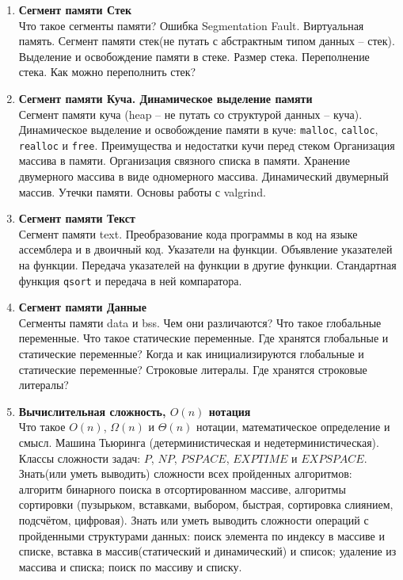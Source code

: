 \documentclass{article}
\begin{document}
\begin{enumerate}
\item \textbf{Сегмент памяти Стек}\\
Что такое сегменты памяти? Ошибка Segmentation Fault. Виртуальная память. Сегмент памяти стек(не путать с абстрактным типом данных -- стек). Выделение и освобождение памяти в стеке. Размер стека. Переполнение стека. Как можно переполнить стек?

\item \textbf{Сегмент памяти Куча. Динамическое выделение памяти}\\
Сегмент памяти куча (heap -- не путать со структурой данных -- куча).
Динамическое выделение и освобождение памяти в куче: \texttt{malloc}, \texttt{calloc}, \texttt{realloc} и \texttt{free}. Преимущества и недостатки кучи перед стеком Организация массива в памяти. Организация связного списка в памяти. Хранение двумерного массива в виде одномерного массива. Динамический двумерный массив. Утечки памяти. Основы работы с valgrind.

\item \textbf{Сегмент памяти Текст}\\
Сегмент памяти text. Преобразование кода программы в код на языке ассемблера и в двоичный код. Указатели на функции. Объявление указателей на функции. Передача указателей на функции в другие функции. Стандартная функция \texttt{qsort} и передача в ней компаратора.

\item \textbf{Сегмент памяти Данные}\\
Сегменты памяти data и bss. Чем они различаются? Что такое глобальные переменные. Что такое статические переменные. Где хранятся глобальные и статические переменные? Когда и как инициализируются глобальные и статические переменные? Строковые литералы. Где хранятся строковые литералы?

\item  \textbf{Вычислительная сложность, $O(n)$ нотация}\\
Что такое $O(n)$, $\Omega(n)$ и $\Theta(n)$ нотации, математическое определение и смысл. Машина Тьюринга (детерминистическая и недетерминистическая). Классы сложности задач: $P$, $NP$, $PSPACE$, $EXPTIME$ и $EXPSPACE$.
Знать(или уметь выводить) сложности всех пройденных алгоритмов: алгоритм бинарного поиска в отсортированном массиве, алгоритмы сортировки (пузырьком, вставками, выбором, быстрая, сортировка слиянием, подсчётом, цифровая). Знать или уметь выводить сложности операций с пройденными структурами данных: поиск элемента по индексу в массиве и списке, вставка в массив(статический и динамический) и список; удаление из массива и списка; поиск по массиву и списку.


\end{enumerate}
\end{document}
